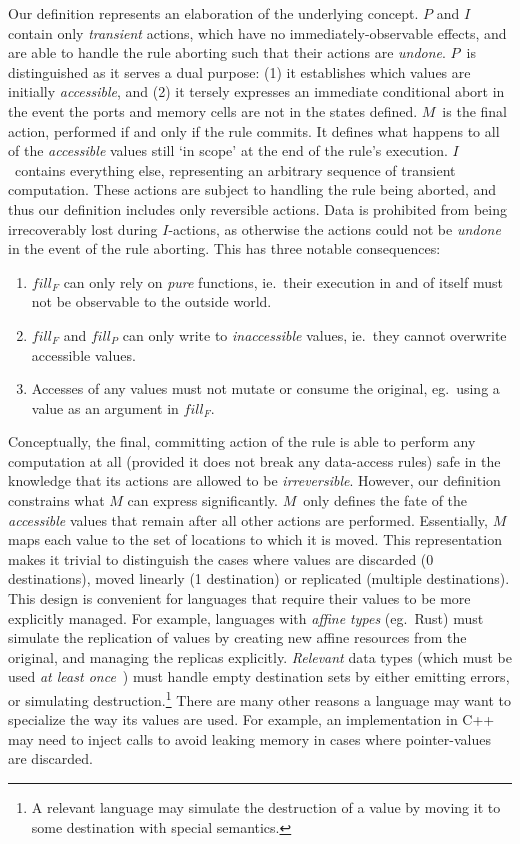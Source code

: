 Our definition represents an elaboration of the underlying concept. $P$ and $I$ contain only \textit{transient} actions, which have no immediately-observable effects, and are able to handle the rule aborting such that their actions are \textit{undone}. $P$~is distinguished as it serves a dual purpose: (1) it establishes which values are initially \textit{accessible}, and (2) it tersely expresses an immediate conditional abort in the event the ports and memory cells are not in the states defined. $M$~is the final action, performed if and only if the rule commits. It defines what happens to all of the \textit{accessible} values still `in scope' at the end of the rule's execution. $I$~contains everything else, representing an arbitrary sequence of transient computation. These actions are subject to handling the rule being aborted, and thus our definition includes only reversible actions. Data is prohibited from being irrecoverably lost during $I$-actions, as otherwise the actions could not be \textit{undone} in the event of the rule aborting. This has three notable consequences:
\begin{enumerate}
	\item $fill_F$ can only rely on \textit{pure} functions, ie.\ their execution in and of itself must not be observable to the outside world.
	\item $fill_F$ and $fill_P$ can only write to \textit{inaccessible} values, ie.\ they cannot overwrite accessible values.
	\item Accesses of any values must not mutate or consume the original, eg.\ using a value as an argument in $fill_F$.
\end{enumerate}

Conceptually, the final, committing action of the rule is able to perform any computation at all (provided it does not break any data-access rules) safe in the knowledge that its actions are allowed to be \textit{irreversible}. However, our definition constrains what $M$ can express significantly. $M$~only defines the fate of the \textit{accessible} values that remain after all other actions are performed. Essentially, $M$ maps each value to the set of locations to which it is moved. This representation makes it trivial to distinguish the cases where values are discarded (0 destinations), moved linearly (1 destination) or replicated (multiple destinations). This design is convenient for languages that require their values to be more explicitly managed. For example, languages with \textit{affine types} (eg.\ Rust) must simulate the replication of values by creating new affine resources from the original, and managing the replicas explicitly.  \textit{Relevant} data types (which must be used \textit{at least once}~\cite{walker2005substructural}) must handle empty destination sets by either emitting errors, or simulating destruction.\footnote{A relevant language may simulate the destruction of a value by moving it to some  destination with special semantics.} There are many other reasons a language may want to specialize the way its values are used. For example, an implementation in C++ may need to inject  calls to avoid leaking memory in cases where pointer-values are discarded.

